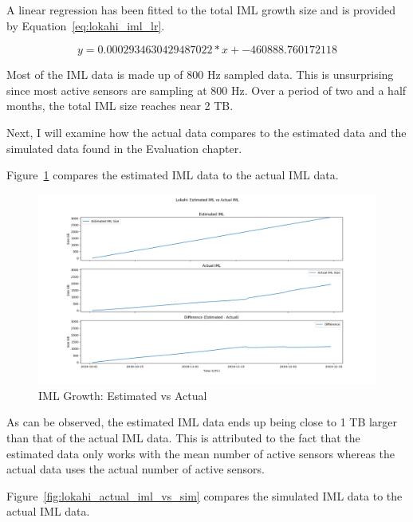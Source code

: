 A linear regression has been fitted to the total IML growth size and is provided by Equation~\ref{eq:lokahi_iml_lr}.

\begin{equation}
    y = 0.0002934630429487022 * x + -460888.760172118
    \label{eq:lokahi_iml_lr}
\end{equation}

Most of the IML data is made up of 800 Hz sampled data. This is unsurprising since most active sensors are sampling at 800 Hz. Over a period of two and a half months, the total IML size reaches near 2 TB.

Next, I will examine how the actual data compares to the estimated data and the simulated data found in the Evaluation chapter.

Figure~\ref{fig:lokahi_actual_iml_vs_est} compares the estimated IML data to the actual IML data.

\begin{figure}[H]
    \centering
    \includegraphics[width=\linewidth]{figures/lokahi_actual_iml_vs_est.png}
    \caption{IML Growth: Estimated vs Actual}
    \label{fig:lokahi_actual_iml_vs_est}
\end{figure}

As can be observed, the estimated IML data ends up being close to 1 TB larger than that of the actual IML data. This is attributed to the fact that the estimated data only works with the mean number of active sensors whereas the actual data uses the actual number of active sensors.

Figure~\ref{fig:lokahi_actual_iml_vs_sim} compares the simulated IML data to the actual IML data.


